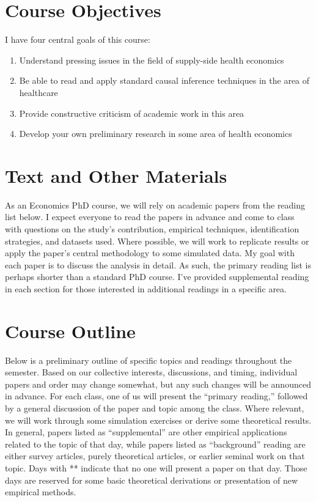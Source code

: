 \documentclass{article}
\begin{document}
\section*{Course Objectives}
I have four central goals of this course:
\begin{enumerate}
 \item Understand pressing issues in the field of supply-side health economics
 \item Be able to read and apply standard causal inference techniques in the area of healthcare
 \item Provide constructive criticism of academic work in this area
 \item Develop your own preliminary research in some area of health economics
\end{enumerate}

\section*{Text and Other Materials}
As an Economics PhD course, we will rely on academic papers from the reading list below. I expect everyone to read the papers in advance and come to class with questions on the study's contribution, empirical techniques, identification strategies, and datasets used. Where possible, we will work to replicate results or apply the paper's central methodology to some simulated data. My goal with each paper is to discuss the analysis in detail. As such, the primary reading list is perhaps shorter than a standard PhD course. I've provided supplemental reading in each section for those interested in additional readings in a specific area.

\section*{Course Outline}
Below is a preliminary outline of specific topics and readings throughout the semester. Based on our collective interests, discussions, and timing, individual papers and order may change somewhat, but any such changes will be announced in advance. For each class, one of us will present the ``primary reading,'' followed by a general discussion of the paper and topic among the class. Where relevant, we will work through some simulation exercises or derive some theoretical results. In general, papers listed as ``supplemental'' are other empirical applications related to the topic of that day, while papers listed as ``background'' reading are either survey articles, purely theoretical articles, or earlier seminal work on that topic. Days with ** indicate that no one will present a paper on that day. Those days are reserved for some basic theoretical derivations or presentation of new empirical methods.
\end{document}
